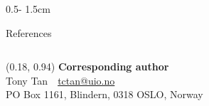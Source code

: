 \documentclass{uioposter}
\begin{document}
\begin{frame}
\begin{columns}[onlytextwidth]
\begin{column}{0.5\textwidth - 1.5cm}
    \begin{block}{References}
        \renewcommand*{\bibfont}{\footnotesize}
        \printbibliography
    \end{block}

\end{column}

\end{columns}

\begin{textblock}{0.5}(0.18, 0.94)
    \color{white}
    \sffamily
    \textbf{Corresponding author}
    \\
    Tony Tan\ \ \url{tctan@uio.no}\\
    PO Box 1161, Blindern, 0318 OSLO, Norway
\end{textblock}

\end{frame}
\end{document}
